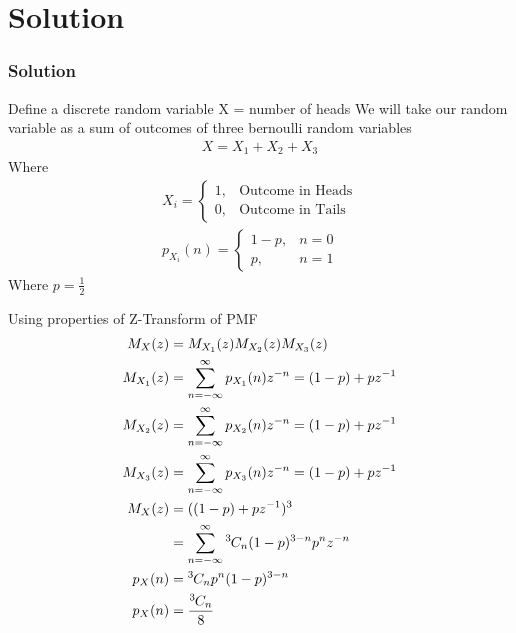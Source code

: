 \documentclass{beamer}
\theoremstyle{remark}
\newcommand*{\permcomb}[4][0mu]{{{}^{#3}\mkern#1#2_{#4}}}
\newcommand*{\comb}[1][-1mu]{\permcomb[#1]{C}}
\numberwithin{equation}{section}
\begin{document}
\section{Solution}
\begin{frame}
\frametitle{Solution}
Define a discrete random variable X = number of heads\newline
We will take our random variable as a sum of outcomes of three bernoulli random variables
\begin{align}
	X = X_1+X_2+X_3
\end{align}
Where
\begin{align}
X_i = 
\begin{cases}
	1, & \text{Outcome in Heads}\\
	0, & \text{Outcome in Tails}
\end{cases}\\
p_{X_i}(n) = 
\begin{cases}
	1-p, & n = 0\\
	p, & n = 1
\end{cases}
\end{align}
Where $p=\frac{1}{2}$\newline
\end{frame}
\begin{frame}
Using properties of Z-Transform of PMF
\begin{align}
	M_X(z) &= M_{X_1}(z)M_{X_2}(z)M_{X_3}(z)\\
	M_{X_1}(z) &= \sum_{n=-\infty}^{\infty}p_{X_1}(n)z^{-n} = (1-p)+pz^{-1}\\
	M_{X_2}(z) &= \sum_{n=-\infty}^{\infty}p_{X_2}(n)z^{-n} = (1-p)+pz^{-1}\\
	M_{X_3}(z) &= \sum_{n=-\infty}^{\infty}p_{X_3}(n)z^{-n} = (1-p)+pz^{-1}\\
	M_X(z) &= ((1-p)+pz^{-1})^3\\
	 &= \sum_{n=-\infty}^{\infty}\comb{3}{n}(1-p)^{3-n}p^nz^{-n}\\
	p_{X}(n) &= \comb{3}{n}p^{n}(1-p)^{3-n}\\
	p_{X}(n) &= \frac{\comb{3}{n}}{8}
\end{align}
\end{frame}
\end{document}
